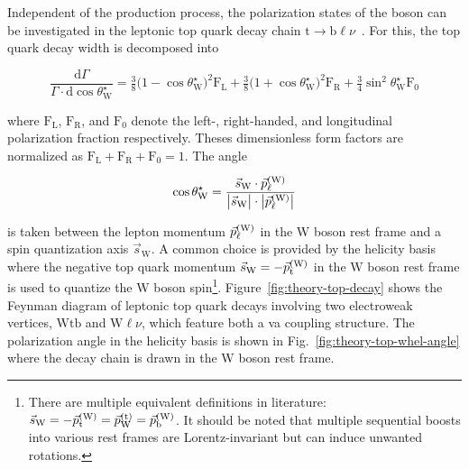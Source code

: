 Independent of the production process, the polarization states of the \wboson boson can be investigated in the leptonic top quark decay chain $\mathrm{t}\to\mathrm{b}\ell\nu$~\cite{AguilarSaavedra:2010nx}. For this, the top quark decay width is decomposed into

\begin{equation}
\frac{\mathrm{d}\Gamma}{\Gamma\cdot\mathrm{d}\cos\theta^\star_\mathrm{W}}=\tfrac{3}{8}\big(1-\cos\theta^\star_\mathrm{W}\big)^{2}\mathrm{F}_\mathrm{L}+\tfrac{3}{8}\big(1+\cos\theta^\star_\mathrm{W}\big)^{2}\mathrm{F}_\mathrm{R}+\tfrac{3}{4}\sin^{2}\theta^\star_\mathrm{W}\mathrm{F}_{0}
\end{equation}

where $\mathrm{F}_\mathrm{L}$, $\mathrm{F}_\mathrm{R}$, and $\mathrm{F}_{0}$ denote the left-, right-handed, and longitudinal polarization fraction respectively. Theses dimensionless form factors are normalized as $\mathrm{F}_\mathrm{L}+\mathrm{F}_\mathrm{R}+\mathrm{F}_{0}=1$. The angle 

\begin{equation}
\cos\theta^\star_\mathrm{W}=\frac{\vec{s}_\mathrm{W}\cdot\vec{p}_{\ell}^\scriptn{\mathrm{(W)}}}{\big|\vec{s}_\mathrm{W}\big|\cdot\big|\vec{p}_{\ell}^\scriptn{\mathrm{(W)}}\big|}
\end{equation}

is taken between the lepton momentum $\vec{p}_{\ell}^\scriptn{\mathrm{(W)}}$ in the W boson rest frame and a spin quantization axis $\vec{s}_\mathrm{W}$. A common choice is provided by the helicity basis where the negative top quark momentum $\vec{s}_\mathrm{W}=-\vec{p}_\mathrm{t}^\scriptn{\mathrm{(W)}}$ in the $\mathrm{W}$ boson rest frame is used to quantize the W boson spin\footnote{There are multiple equivalent definitions in literature: $\vec{s}_\mathrm{W}=-\vec{p}_\mathrm{t}^\scriptn{\mathrm{(W)}}=\vec{p}_\mathrm{W}^\scriptn{\mathrm{(t)}}=\vec{p}_\mathrm{b}^\scriptn{\mathrm{(W)}}$. It should be noted that multiple sequential boosts into various rest frames are Lorentz-invariant but can induce unwanted rotations.}. Figure~\ref{fig:theory-top-decay} shows the Feynman diagram of leptonic top quark decays involving two electroweak vertices, $\mathrm{Wtb}$ and $\mathrm{W}\ell\nu$, which feature both a \gls{va} coupling structure. The polarization angle in the helicity basis is shown in Fig.~\ref{fig:theory-top-whel-angle} where the decay chain is drawn in the W boson rest frame.

